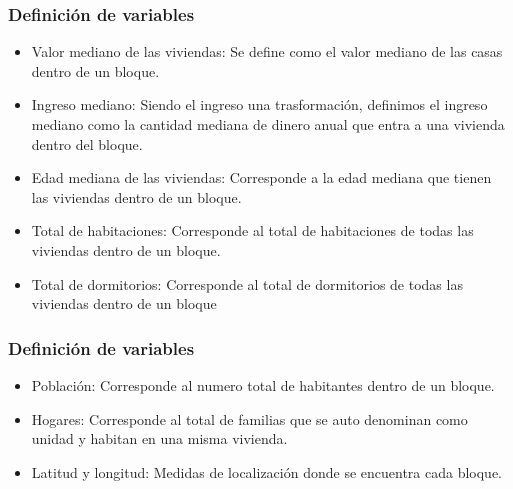 \documentclass[12pt]{beamer}
\begin{document}
\begin{frame}
\frametitle{Definición de variables}
\begin{itemize}
\item Valor mediano de las viviendas: Se define como el valor mediano de las casas dentro de un bloque.
\item Ingreso mediano: Siendo el ingreso una trasformación, definimos el ingreso mediano como la cantidad mediana de dinero anual que entra a una vivienda dentro del bloque.
\item Edad mediana de las viviendas: Corresponde a la edad mediana que tienen las viviendas dentro de un bloque.
\item Total de habitaciones: Corresponde al total de habitaciones de todas las viviendas dentro de un bloque.
\item Total de dormitorios: Corresponde al total de dormitorios de todas las viviendas dentro de un bloque
\end{itemize}
\end{frame}
\begin{frame}
\frametitle{Definición de variables}
\begin{itemize}
\item Población: Corresponde al numero total de habitantes dentro de un bloque.
\item Hogares: Corresponde al total de familias que se auto denominan como unidad y habitan en una misma vivienda.
\item Latitud y longitud: Medidas de localización donde se encuentra cada bloque.
\end{itemize}
\end{frame}
\end{document}
